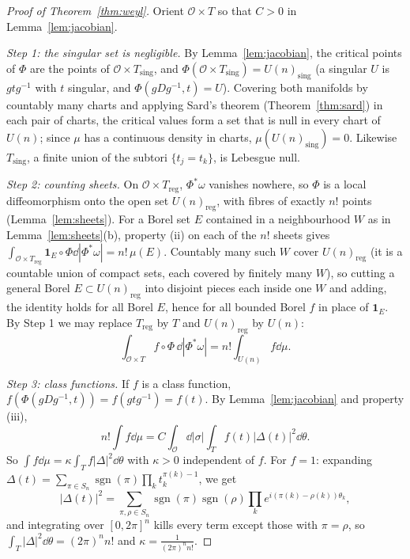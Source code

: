 \begin{proof}[Proof of Theorem~\ref{thm:weyl}]
Orient $\mathcal O\times T$ so that $C>0$ in Lemma~\ref{lem:jacobian}.

\emph{Step 1: the singular set is negligible.} By Lemma~\ref{lem:jacobian}, the critical points of $\Phi$ are the points of $\mathcal O\times T_{\mathrm{sing}}$, and $\Phi(\mathcal O\times T_{\mathrm{sing}})=U(n)_{\mathrm{sing}}$
(a singular $U$ is $gtg^{-1}$ with $t$ singular, and $\Phi(gDg^{-1},t)=U$). Covering both manifolds by countably many charts and applying Sard's theorem (Theorem~\ref{thm:sard}) in each pair of charts, the critical
values form a set that is null in every chart of $U(n)$; since $\mu$ has a continuous density in charts, $\mu(U(n)_{\mathrm{sing}})=0$. Likewise $T_{\mathrm{sing}}$, a finite union of the subtori $\{t_j=t_k\}$, is Lebesgue null.

\emph{Step 2: counting sheets.} On $\mathcal O\times T_{\mathrm{reg}}$, $\Phi^*\omega$ vanishes nowhere, so $\Phi$ is a local diffeomorphism onto the open set $U(n)_{\mathrm{reg}}$, with fibres of exactly $n!$ points
(Lemma~\ref{lem:sheets}). For a Borel set $E$ contained in a neighbourhood $W$ as in Lemma~\ref{lem:sheets}(b), property (ii) on each of the $n!$ sheets gives
$\int_{\mathcal O\times T_{\mathrm{reg}}}\mathbf 1_E\circ\Phi\dd|\Phi^*\omega|=n!\,\mu(E)$. Countably many such $W$ cover $U(n)_{\mathrm{reg}}$ (it is a countable union of compact sets, each covered by finitely
many $W$), so cutting a general Borel $E\subset U(n)_{\mathrm{reg}}$ into disjoint pieces each inside one $W$ and adding, the identity holds for all Borel $E$, hence for all bounded Borel $f$ in place of
$\mathbf 1_E$. By Step 1 we may replace $T_{\mathrm{reg}}$ by $T$ and $U(n)_{\mathrm{reg}}$ by $U(n)$:
\[\int_{\mathcal O\times T}f\circ\Phi\,\dd|\Phi^*\omega|=n!\int_{U(n)}f\dd\mu.\]

\emph{Step 3: class functions.} If $f$ is a class function, $f(\Phi(gDg^{-1},t))=f(gtg^{-1})=f(t)$. By Lemma~\ref{lem:jacobian} and property (iii),
\[n!\int f\dd\mu=C\int_{\mathcal O}\dd|\sigma|\int_Tf(t)|\Delta(t)|^2\dd\theta.\]
So $\int f\dd\mu=\kappa\int_Tf|\Delta|^2\dd\theta$ with $\kappa>0$ independent of $f$. For $f=1$: expanding $\Delta(t)=\sum_{\pi\in S_n}\operatorname{sgn}(\pi)\prod_kt_k^{\pi(k)-1}$, we get
\[|\Delta(t)|^2=\sum_{\pi,\rho\in S_n}\operatorname{sgn}(\pi)\operatorname{sgn}(\rho)\prod_ke^{i(\pi(k)-\rho(k))\theta_k},\]
and integrating over $[0,2\pi]^n$ kills every term except those with $\pi=\rho$, so $\int_T|\Delta|^2\dd\theta=(2\pi)^nn!$ and $\kappa=\frac1{(2\pi)^nn!}$.
\end{proof}

